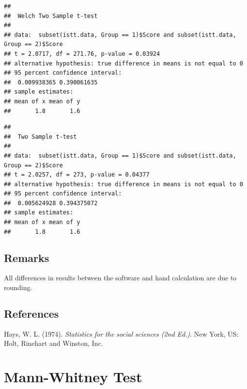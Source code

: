 \documentclass[
]{book}
\newenvironment{Shaded}{\begin{snugshade}}{\end{snugshade}}
\newcommand{\DataTypeTok}[1]{\textcolor[rgb]{0.13,0.29,0.53}{#1}}
\newcommand{\DecValTok}[1]{\textcolor[rgb]{0.00,0.00,0.81}{#1}}
\newcommand{\KeywordTok}[1]{\textcolor[rgb]{0.13,0.29,0.53}{\textbf{#1}}}
\newcommand{\NormalTok}[1]{#1}
\newcommand{\OperatorTok}[1]{\textcolor[rgb]{0.81,0.36,0.00}{\textbf{#1}}}
\newcommand{\StringTok}[1]{\textcolor[rgb]{0.31,0.60,0.02}{#1}}
\begin{document}
\begin{verbatim}
## 
## 	Welch Two Sample t-test
## 
## data:  subset(istt.data, Group == 1)$Score and subset(istt.data, Group == 2)$Score
## t = 2.0717, df = 271.76, p-value = 0.03924
## alternative hypothesis: true difference in means is not equal to 0
## 95 percent confidence interval:
##  0.009938365 0.390061635
## sample estimates:
## mean of x mean of y 
##       1.8       1.6
\end{verbatim}

\begin{Shaded}
\end{Shaded}

\begin{verbatim}
## 
## 	Two Sample t-test
## 
## data:  subset(istt.data, Group == 1)$Score and subset(istt.data, Group == 2)$Score
## t = 2.0257, df = 273, p-value = 0.04377
## alternative hypothesis: true difference in means is not equal to 0
## 95 percent confidence interval:
##  0.005624928 0.394375072
## sample estimates:
## mean of x mean of y 
##       1.8       1.6
\end{verbatim}

\hypertarget{remarks}{%
\subsection{Remarks}\label{remarks}}

All differences in results between the software and hand calculation are due to rounding.

\hypertarget{references}{%
\subsection{References}\label{references}}

Hays, W. L. (1974). \emph{Statistics for the social sciences (2nd Ed.)}. New York, US: Holt, Rinehart and Winston, Inc.

\hypertarget{mann-whitney-test}{%
\section{Mann-Whitney Test}\label{mann-whitney-test}}
\end{document}
